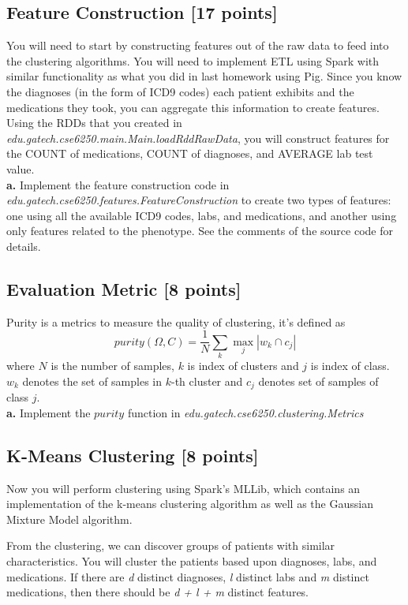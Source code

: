 \documentclass[12pt]{article}
\begin{document}
\subsection{Feature Construction [17 points]}
You will need to start by constructing features out of the raw data to feed into the clustering algorithms. You will need to implement ETL using Spark with similar functionality as what you did in last homework using Pig. Since you know the diagnoses (in the form of ICD9 codes) each patient exhibits and the medications they took, you can aggregate this information to create features. Using the RDDs that you created in \textit{edu.gatech.cse6250.main.Main.loadRddRawData}, you will construct features for the COUNT of medications, COUNT of diagnoses, and AVERAGE lab test value. \\

\textbf{a.} Implement the feature construction code in \textit{edu.gatech.cse6250.features.FeatureConstruction} to create two types of features: one using all the available ICD9 codes, labs, and medications, and another using only features related to the phenotype. See the comments of the source code for details.

\subsection{Evaluation Metric [8 points]}
Purity is a metrics to measure the quality of clustering, it's defined as
$$
purity(\Omega, C) = \frac{1}{N}\sum_k \max_j |w_k \cap c_j|
$$
 where $N$ is the number of samples, $k$ is index of clusters and $j$ is index of class. $w_k$ denotes the set of samples in $k$-th cluster and $c_j$ denotes set of samples of class $j$. \\
 
\textbf{a.} Implement the $purity$ function in \textit{edu.gatech.cse6250.clustering.Metrics}

\subsection{K-Means Clustering [8 points] } 
Now you will perform clustering using Spark's MLLib, which contains an implementation of the k-means clustering algorithm as well as the Gaussian Mixture Model algorithm.

From the clustering, we can discover groups of patients with similar characteristics. You will cluster the patients based upon diagnoses, labs, and medications. If there are \textit{d} distinct diagnoses, \textit{l} distinct labs and \textit{m} distinct medications, then there should be \textit{d + l + m} distinct features.
\end{document}
